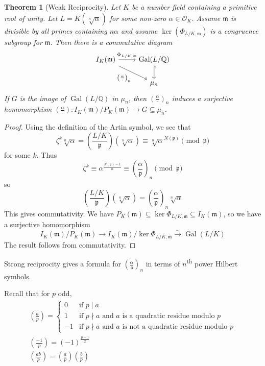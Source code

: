 \documentclass[11pt]{article}
\theoremstyle{definition}
\theoremstyle{plain}
\newtheorem{theorem}[definition]{Theorem}
\theoremstyle{remark}
\DeclareMathOperator{\Gal}{Gal}
\newcommand{\QQ}{\mathbb{Q}}
\newcommand{\cO}{\mathcal{O}}
\newcommand{\fa}{\mathfrak{a}}
\newcommand{\fp}{\mathfrak{p}}
\newcommand{\fm}{\mathfrak{m}}
\newcommand{\leg}[2]{\left(\frac{#1}{#2}\right)}
\begin{document}
\begin{theorem}[Weak Reciprocity]\label{thm:4_11}
    Let $K$ be a number field containing a primitive root of unity. Let $L = K(\sqrt[n]{\alpha})$ for some non-zero $\alpha \in \cO_K$. Assume $\fm$ is divisible by all primes containing $n\alpha$ and assume $\ker(\Phi_{L/K, \fm})$ is a congruence subgroup for $\fm$. Then there is a commutative diagram
    \begin{equation*}
    \begin{tikzcd}
        I_K(\fm) \arrow[r, "\Phi_{L/K, \fm}"] \arrow[rd, "\leg{\alpha}{\cdot}_n"'] & \Gal(L/\QQ) \arrow[d, hookrightarrow]\\
                           & \mu_n
    \end{tikzcd}
    \end{equation*}
    If $G$ is the image of $\Gal(L/\QQ)$ in $\mu_n$, then $\leg{\alpha}{\cdot}_n$ induces a surjective homomorphism $\leg{\alpha}{\cdot} : I_K(\fm)/P_K(\fm) \to G \subseteq \mu_n$.
\end{theorem}
\begin{proof}
    Using the definition of the Artin symbol, we see that
    \begin{equation*}
        \zeta^k \sqrt[n]{\alpha} = \leg{L/K}{\fp}(\sqrt[n]{\alpha}) \equiv \sqrt[n]{\alpha}^{N(\fp)} \pmod{\fp}
    \end{equation*}
    for some $k$. Thus
    \begin{equation*}
        \zeta^k \equiv \alpha^\frac{N(\fp)-1}{n} \equiv \leg{\alpha}{\fp}_n \pmod{\fp}
    \end{equation*}
    so
    \begin{equation*}
        \leg{L/K}{\fp}(\sqrt[n]{\alpha}) = \leg{\alpha}{\fp}_n \sqrt[n]{\alpha}
    \end{equation*}
    This gives commutativity. We have $P_K(\fm) \subseteq \ker \Phi_{L/K, \fm} \subseteq I_K(\fm)$, so we have a surjective homomorphism
    \begin{equation*}
        I_K(\fm) / P_K(\fm) \to I_K(\fm) / \ker \Phi_{L/K, \fm} \xrightarrow{\sim} \Gal(L/K)
    \end{equation*}
    The result follows from commutativity.
\end{proof}

\noindent Strong reciprocity gives a formula for $\leg{\alpha}{\fa}_n$ in terms of $n$\textsuperscript{th} power Hilbert symbols.

\noindent Recall that for $p$ odd,
\begin{gather*}
    \leg{a}{p} =
    \begin{cases}
        0 & \text{if } p \mid a\\
        1 & \text{if } p \nmid a \text{ and } a \text{ is a quadratic residue modulo } p\\
        -1 & \text{if } p \nmid a \text{ and } a \text{ is not a quadratic residue modulo } p
    \end{cases}\\
    \leg{-1}{p} = (-1)^{\frac{p-1}{2}}\\
    \leg{ab}{p} = \leg{a}{p} \leg{b}{p}
\end{gather*}
\end{document}
